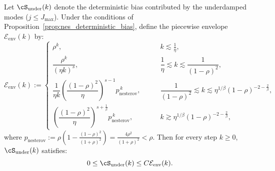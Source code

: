 \documentclass[11pt]{article}
\newcommand{\nesterov}{\mathrm{nesterov}}
\begin{document}
\begin{lemma}
\label{lem:nes_underdamped_transient_properties}
Let $\cS_{\mathrm{under}}(k)$ denote the deterministic bias contributed by the underdamped modes ($j \le J_{\max}$). Under the conditions of Proposition~\ref{prop:nes_deterministic_bias}, define the piecewise envelope $\mathcal{E}_{\mathrm{env}}(k)$ by:
\begin{equation*}
    \mathcal{E}_{\mathrm{env}}(k) := 
    \begin{cases}
    \rho^k, &\qquad k\lesssim\frac{1}{\eta},\\[2mm]
    \dfrac{\rho^k}{(\eta k)^s}, &\qquad \dfrac{1}{\eta} \lesssim k \lesssim \dfrac{1}{(1-\rho)^2},\\[3mm]
    \dfrac{1}{\eta k}\left(\dfrac{(1-\rho)^2}{\eta}\right)^{s-1}p_{\nesterov}^{\,k}, &\qquad \dfrac{1}{(1-\rho)^2} \lesssim k \lesssim \eta^{1/\beta}(1-\rho)^{-2-\frac{2}{\beta}},\\[3mm]
    \left(\dfrac{(1-\rho)^2}{\eta}\right)^{s+\frac{1}{\beta}}p_{\nesterov}^{\,k}, &\qquad k \gtrsim \eta^{1/\beta}(1-\rho)^{-2-\frac{2}{\beta}},
    \end{cases}
\end{equation*}
where $p_{\nesterov} := \rho\left(1 - \frac{(1-\rho)^2}{(1+\rho)^2}\right) = \frac{4\rho^2}{(1+\rho)^2} < \rho$. Then for every step $k \ge 0$, $\cS_{\mathrm{under}}(k)$ satisfies:
\begin{equation*}
    0 \le \cS_{\mathrm{under}}(k) \le C \mathcal{E}_{\mathrm{env}}(k).
\end{equation*}
\end{lemma}
\end{document}
